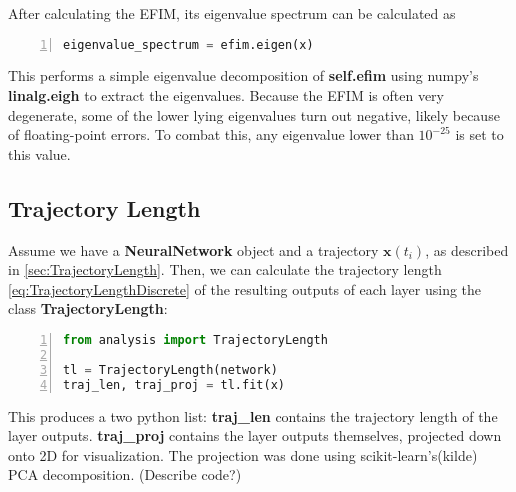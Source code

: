 After calculating the EFIM, its eigenvalue spectrum can be calculated as 

\begin{lstlisting}[language=python, numbers=left]
eigenvalue_spectrum = efim.eigen(x)
\end{lstlisting}
This performs a simple eigenvalue decomposition of \textbf{self.efim} using numpy's \textbf{linalg.eigh} to extract the eigenvalues. Because the EFIM is often very degenerate, some of the lower lying eigenvalues turn out negative, likely because of floating-point errors. To combat this, any eigenvalue lower than $10^{-25}$ is set to this value. 

\subsection{Trajectory Length}\label{sec:TrajectoryLengthImplement}
Assume we have a \textbf{NeuralNetwork} object and a trajectory $\boldsymbol{x}(t_i)$, as described in \autoref{sec:TrajectoryLength}. Then, we can calculate the trajectory length \autoref{eq:TrajectoryLengthDiscrete} of the resulting outputs of each layer using the class \textbf{TrajectoryLength}:

\begin{lstlisting}[language=python, numbers=left]
from analysis import TrajectoryLength

tl = TrajectoryLength(network)
traj_len, traj_proj = tl.fit(x)
\end{lstlisting}
This produces a two python list: \textbf{traj\_len} contains the trajectory length of the layer outputs. \textbf{traj\_proj} contains the layer outputs themselves, projected down onto 2D for visualization. The projection was done using scikit-learn's(kilde) PCA decomposition. (Describe code?)
























